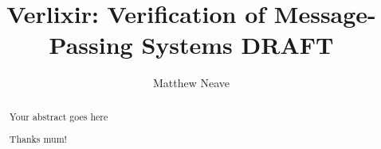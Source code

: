 \documentclass[a4paper, twoside]{report}
\title{Verlixir: Verification of Message-Passing Systems DRAFT}
\author{Matthew Neave}
\begin{document}


\begin{abstract}
Your abstract goes here
\end{abstract}

\renewcommand{\abstractname}{Acknowledgements}
\begin{abstract}
Thanks mum!
\end{abstract}

\tableofcontents
\listoffigures
\lstlistoflistings

% 







% 
% 



% 
% 
\end{document}
